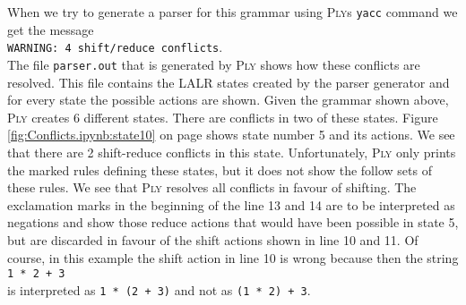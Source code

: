 When we try to generate a parser for this grammar using \textsc{Ply}s \texttt{yacc} command we get the message
\\[0.2cm]
\hspace*{1.3cm}
\texttt{WARNING: 4 shift/reduce conflicts}.
\\[0.2cm]
The file \texttt{parser.out} that is generated by \textsc{Ply} shows how these conflicts are resolved.
This file contains the LALR states created by the parser generator and for every state the possible actions are
shown.  Given the grammar shown above, \textsc{Ply} creates 6 different states.  There are conflicts in two of
these states.  Figure \ref{fig:Conflicts.ipynb:state10} on page \pageref{fig:Conflicts.ipynb:state10} shows state
number 5 and its actions.   We see that there are 2 shift-reduce conflicts in this state.  Unfortunately,
\textsc{Ply} only prints the marked rules defining these states, but it does not show the follow sets of these
rules.  We see that \textsc{Ply} resolves all conflicts in favour of shifting.  The exclamation marks in the
beginning of the line 13 and 14 are to be interpreted as negations and show those reduce actions that would have
been possible in state 5, but are discarded in favour of the shift actions shown in line 10 and 11.
Of course, in this example the shift action in line 10 is wrong because then the string
\\[0.2cm]
\hspace*{1.3cm}
\texttt{1 * 2 + 3}
\\[0.2cm]
is interpreted as \texttt{1 * (2 + 3)} and not as \texttt{(1 * 2) + 3}.
\FloatBarrier


